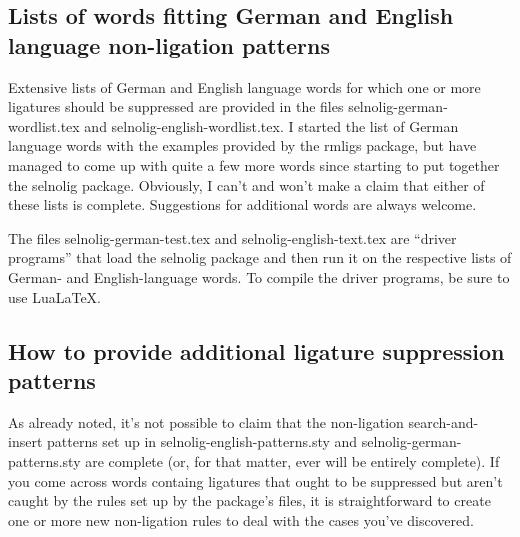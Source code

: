 \documentclass[12pt]{article}
\newcommand{\pkg}[1]{\textsf{#1}}
\begin{document}
\subsection{Lists of words fitting German and English language non-ligation patterns}

Extensive lists of German and English language words for which one or more ligatures should be suppressed are provided in the files \pkg{selnolig-german-wordlist.tex} and \pkg{selnolig-english-wordlist.tex}. I started the list of German language words with the examples provided by the \pkg{rmligs} package, but have managed to come up with quite a few more words since starting to put together the \pkg{selnolig} package. Obviously, I can't and won't make a claim that either of these lists is complete. Suggestions for additional words are always welcome.

The files \pkg{selnolig-german-test.tex} and \pkg{selnolig-english-text.tex} are \enquote{driver programs} that load the \pkg{selnolig} package and then run it on the respective lists of German- and English-language words. To compile the driver programs, be sure to use Lua\LaTeX.


\subsection{How to provide additional ligature suppression patterns}

As already noted, it's not possible to claim that the non-ligation search-and-insert patterns set up in \pkg{selnolig-english-patterns.sty} and \pkg{selnolig-german-patterns.sty} are complete (or, for that matter, ever will be entirely complete). If you come across words containg ligatures that ought to be suppressed but aren't caught by the rules set up by the package's files, it is straightforward to create one or more new non-ligation rules to deal with the cases you've discovered.
\end{document}
